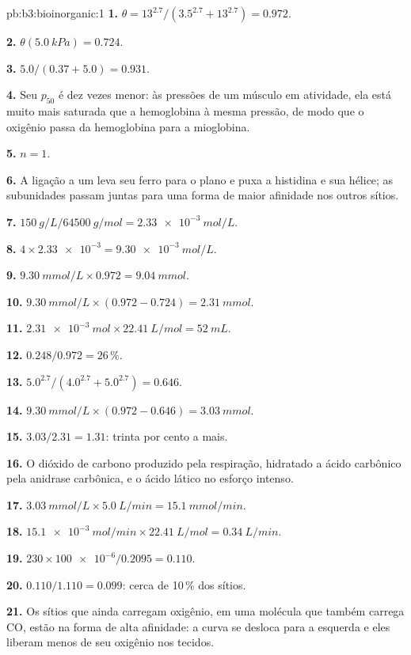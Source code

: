 \begin{solution}{pb:b3:bioinorganic:1}
\textbf{1.} $\theta = 13^{2.7}/(3.5^{2.7} + 13^{2.7}) = 0.972$.

\textbf{2.} $\theta(\qty{5.0}{kPa}) = 0.724$.

\textbf{3.} $5.0/(0.37 + 5.0) = 0.931$.

\textbf{4.} Seu $p_{50}$ é dez vezes menor: às pressões de um músculo em atividade, ela está muito mais
saturada que a hemoglobina à mesma pressão, de modo que o oxigênio passa da
hemoglobina para a mioglobina.

\textbf{5.} $n = 1$.

\textbf{6.} A ligação a um  leva seu ferro para o plano e puxa a histidina e
sua hélice; as subunidades passam juntas para uma forma de maior afinidade nos
outros sítios.

\textbf{7.} $\qty{150}{g/L}/\qty{64500}{g/mol} = \qty{2.33e-3}{mol/L}$.

\textbf{8.} $4 \times \num{2.33e-3} = \qty{9.30e-3}{mol/L}$.

\textbf{9.} $\qty{9.30}{mmol/L} \times 0.972 = \qty{9.04}{mmol}$.

\textbf{10.} $\qty{9.30}{mmol/L} \times (0.972 - 0.724) = \qty{2.31}{mmol}$.

\textbf{11.} $\qty{2.31e-3}{mol} \times \qty{22.41}{L/mol} = \qty{52}{mL}$.

\textbf{12.} $0.248/0.972 = 26$\,\%.

\textbf{13.} $5.0^{2.7}/(4.0^{2.7} + 5.0^{2.7}) = 0.646$.

\textbf{14.} $\qty{9.30}{mmol/L} \times (0.972 - 0.646) = \qty{3.03}{mmol}$.

\textbf{15.} $3.03/2.31 = 1.31$: trinta por cento a mais.

\textbf{16.} O dióxido de carbono produzido pela respiração, hidratado a ácido carbônico pela
anidrase carbônica, e o ácido lático no esforço intenso.

\textbf{17.} $\qty{3.03}{mmol/L} \times \qty{5.0}{L/min} = \qty{15.1}{mmol/min}$.

\textbf{18.} $\qty{15.1e-3}{mol/min} \times \qty{22.41}{L/mol} = \qty{0.34}{L/min}$.

\textbf{19.} $230 \times \num{100e-6}/0.2095 = 0.110$.

\textbf{20.} $0.110/1.110 = 0.099$: cerca de 10\,\% dos sítios.

\textbf{21.} Os sítios que ainda carregam oxigênio, em uma molécula que também carrega CO, estão na
forma de alta afinidade: a curva se desloca para a esquerda e eles liberam menos de
seu oxigênio nos tecidos.


\end{solution}
